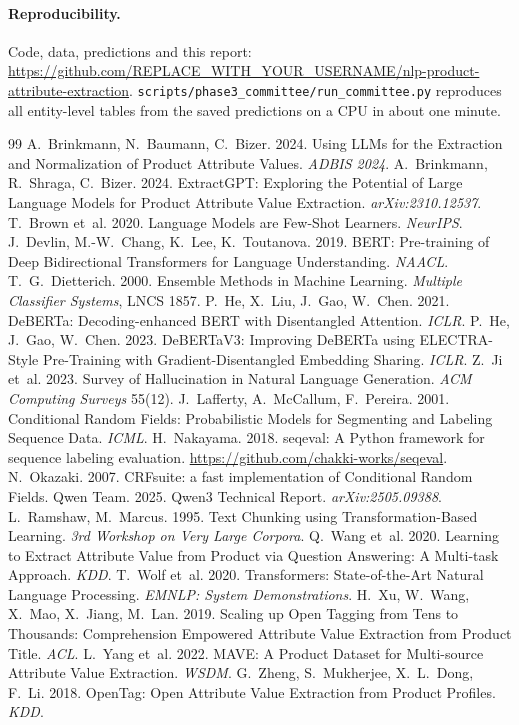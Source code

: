 \documentclass[10pt,twocolumn,a4paper]{article}
\begin{document}
\paragraph{Reproducibility.} Code, data, predictions and this report: \url{https://github.com/REPLACE_WITH_YOUR_USERNAME/nlp-product-attribute-extraction}. \texttt{scripts/phase3\_committee/run\_committee.py} reproduces all entity-level tables from the saved predictions on a CPU in about one minute.

\small
\begin{thebibliography}{99}
 A.~Brinkmann, N.~Baumann, C.~Bizer. 2024. Using LLMs for the Extraction and Normalization of Product Attribute Values. \emph{ADBIS 2024}.
 A.~Brinkmann, R.~Shraga, C.~Bizer. 2024. ExtractGPT: Exploring the Potential of Large Language Models for Product Attribute Value Extraction. \emph{arXiv:2310.12537}.
 T.~Brown et~al. 2020. Language Models are Few-Shot Learners. \emph{NeurIPS}.
 J.~Devlin, M.-W.~Chang, K.~Lee, K.~Toutanova. 2019. BERT: Pre-training of Deep Bidirectional Transformers for Language Understanding. \emph{NAACL}.
 T.~G.~Dietterich. 2000. Ensemble Methods in Machine Learning. \emph{Multiple Classifier Systems}, LNCS 1857.
 P.~He, X.~Liu, J.~Gao, W.~Chen. 2021. DeBERTa: Decoding-enhanced BERT with Disentangled Attention. \emph{ICLR}.
 P.~He, J.~Gao, W.~Chen. 2023. DeBERTaV3: Improving DeBERTa using ELECTRA-Style Pre-Training with Gradient-Disentangled Embedding Sharing. \emph{ICLR}.
 Z.~Ji et~al. 2023. Survey of Hallucination in Natural Language Generation. \emph{ACM Computing Surveys} 55(12).
 J.~Lafferty, A.~McCallum, F.~Pereira. 2001. Conditional Random Fields: Probabilistic Models for Segmenting and Labeling Sequence Data. \emph{ICML}.
 H.~Nakayama. 2018. seqeval: A Python framework for sequence labeling evaluation. \url{https://github.com/chakki-works/seqeval}.
 N.~Okazaki. 2007. CRFsuite: a fast implementation of Conditional Random Fields.
 Qwen Team. 2025. Qwen3 Technical Report. \emph{arXiv:2505.09388}.
 L.~Ramshaw, M.~Marcus. 1995. Text Chunking using Transformation-Based Learning. \emph{3rd Workshop on Very Large Corpora}.
 Q.~Wang et~al. 2020. Learning to Extract Attribute Value from Product via Question Answering: A Multi-task Approach. \emph{KDD}.
 T.~Wolf et~al. 2020. Transformers: State-of-the-Art Natural Language Processing. \emph{EMNLP: System Demonstrations}.
 H.~Xu, W.~Wang, X.~Mao, X.~Jiang, M.~Lan. 2019. Scaling up Open Tagging from Tens to Thousands: Comprehension Empowered Attribute Value Extraction from Product Title. \emph{ACL}.
 L.~Yang et~al. 2022. MAVE: A Product Dataset for Multi-source Attribute Value Extraction. \emph{WSDM}.
 G.~Zheng, S.~Mukherjee, X.~L.~Dong, F.~Li. 2018. OpenTag: Open Attribute Value Extraction from Product Profiles. \emph{KDD}.
\end{thebibliography}
\end{document}

